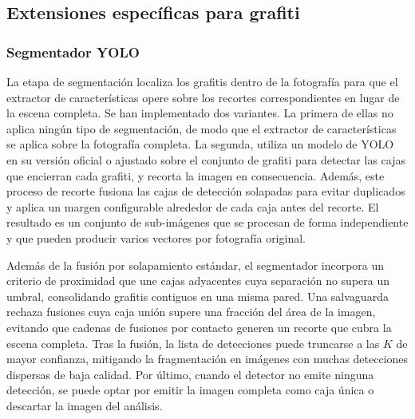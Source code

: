 \subsection{Extensiones específicas para grafiti}
\label{subsec:extras}

\subsubsection{Segmentador YOLO}
\label{subsubsec:segmentador}
La etapa de segmentación localiza los grafitis dentro de la fotografía para que
el extractor de características opere sobre los recortes correspondientes en
lugar de la escena completa. Se han implementado dos variantes. La primera
de ellas no aplica ningún tipo de segmentación, de modo que el extractor de
características se aplica sobre la fotografía completa. La segunda, utiliza
un modelo de YOLO~\cite{ultralytics_ultralytics_2024} en su versión oficial o
ajustado sobre el conjunto de grafiti para detectar las cajas que encierran
cada grafiti, y recorta la imagen en consecuencia. Además, este proceso de
recorte fusiona las cajas de detección solapadas para evitar duplicados y
aplica un margen configurable alrededor de cada caja antes del recorte. El
resultado es un conjunto de sub-imágenes que se procesan de forma independiente
y que pueden producir varios vectores por fotografía original.

Además de la fusión por solapamiento estándar, el segmentador incorpora un
criterio de proximidad que une cajas adyacentes cuya separación no supera un
umbral, consolidando grafitis contiguos en una misma pared. Una salvaguarda
rechaza fusiones cuya caja unión supere una fracción del área de la imagen,
evitando que cadenas de fusiones por contacto generen un recorte que cubra la
escena completa. Tras la fusión, la lista de detecciones puede truncarse a las
$K$ de mayor confianza, mitigando la fragmentación en imágenes con muchas
detecciones dispersas de baja calidad. Por último, cuando el detector no emite
ninguna detección, se puede optar por emitir la imagen completa como caja única
o descartar la imagen del análisis.

